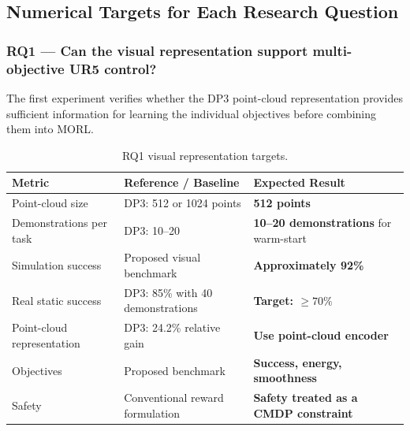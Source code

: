 \documentclass[journal]{IEEEtran}
\begin{document}

\subsection{Numerical Targets for Each Research Question}


\subsubsection{RQ1 --- Can the visual representation support
multi-objective UR5 control?}

The first experiment verifies whether the DP3 point-cloud
representation provides sufficient information for learning the
individual objectives before combining them into MORL.

\begin{table}[t]
\centering
\caption{RQ1 visual representation targets.}
\label{tab:rq1}
\renewcommand{\arraystretch}{1.25}

\begin{tabular}{l l l}
\toprule
\textbf{Metric}
&
\textbf{Reference / Baseline}
&
\textbf{Expected Result}
\\
\midrule

Point-cloud size
&
DP3: 512 or 1024 points
&
\textbf{512 points}
\\

Demonstrations per task
&
DP3: 10--20
&
\textbf{10--20 demonstrations} for warm-start
\\

Simulation success
&
Proposed visual benchmark
&
\textbf{Approximately 92\%}
\\

Real static success
&
DP3: 85\% with 40 demonstrations
&
\textbf{Target: $\geq70\%$}
\\

Point-cloud representation
&
DP3: 24.2\% relative gain
&
\textbf{Use point-cloud encoder}
\\

Objectives
&
Proposed benchmark
&
\textbf{Success, energy, smoothness}
\\

Safety
&
Conventional reward formulation
&
\textbf{Safety treated as a CMDP constraint}
\\

\bottomrule
\end{tabular}
\end{table}
\end{document}
